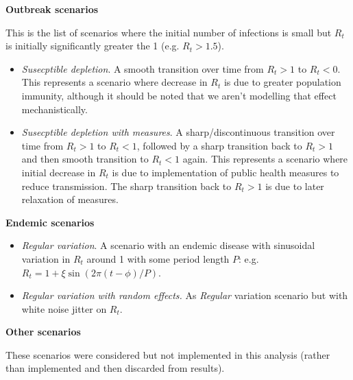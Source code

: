 \documentclass{getwriting}
\begin{document}
\textbf{Outbreak scenarios}

This is the list of scenarios where the initial number of infections is small but $R_t$ is initially significantly greater the 1 (e.g. $R_t > 1.5$).

\begin{itemize}
    \item  \textit{Susecptible depletion}. A smooth transition over time from $R_t > 1$ to $R_t < 0$. This represents a scenario where decrease in $R_t$ is due to greater population immunity, although it should be noted that we aren't modelling that effect mechanistically.
    \item \textit{Susecptible depletion with measures}. A sharp/discontinuous transition over time from $R_t > 1$ to $R_t < 1$, followed by a sharp transition back to $R_t > 1$ and then smooth transition to $R_t < 1$ again. This represents a scenario where initial decrease in $R_t$ is due to implementation of public health measures to reduce transmission. The sharp transition back to $R_t > 1$ is due to later relaxation of measures.
\end{itemize}

\textbf{Endemic scenarios}

\begin{itemize}
    \item \textit{Regular variation}. A scenario with an endemic disease with sinusoidal variation in $R_t$ around 1 with some period length $P$: e.g. $R_t = 1 + \xi \sin(2 \pi (t - \phi) / P)$.
    \item \textit{Regular variation with random effects.} As \textit{Regular} variation scenario but with white noise jitter on $R_t$.
\end{itemize}

\textbf{Other scenarios}

These scenarios were considered but not implemented in this analysis (rather than implemented and then discarded from results).
\end{document}
